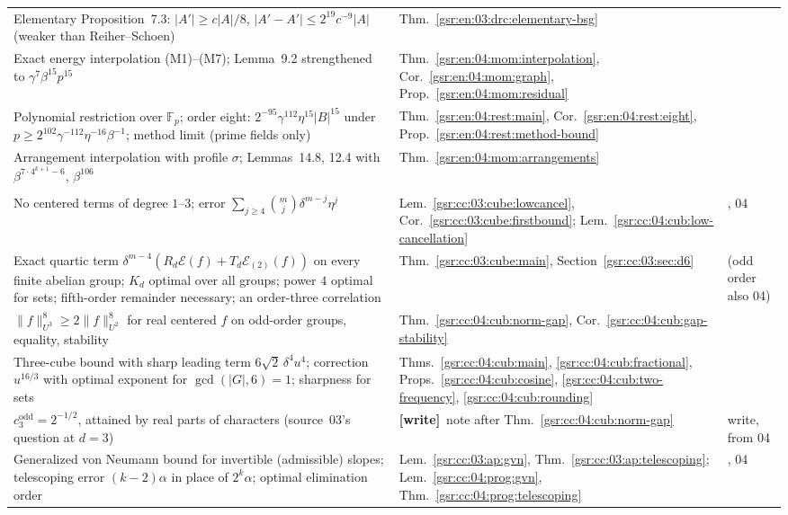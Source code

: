 \documentclass[11pt,letterpaper]{article}
\numberwithin{equation}{section}
\theoremstyle{definition}
\theoremstyle{remark}
\newcommand{\F}{\mathbb F}
\newcommand{\1}{\mathbf 1}
\newcommand{\wtag}{\textup{\textbf{[write]}}}
\begin{document}
\begin{longtable}{@{}>{\raggedright\arraybackslash}p{} >{\raggedright\arraybackslash}p{} >{\raggedright\arraybackslash}p{}@{}}
Elementary Proposition~7.3: $|A'|\ge c|A|/8$, $|A'-A'|\le2^{19}c^{-9}|A|$ (weaker than Reiher--Schoen) & Thm.~\ref{gsr:en:03:drc:elementary-bsg} & 03\\
Exact energy interpolation (M1)--(M7); Lemma~9.2 strengthened to $\gamma^7\beta^{15}p^{15}$ & Thm.~\ref{gsr:en:04:mom:interpolation}, Cor.~\ref{gsr:en:04:mom:graph}, Prop.~\ref{gsr:en:04:mom:residual} & 04\\
Polynomial restriction over $\F_p$; order eight: $2^{-95}\gamma^{112}\eta^{15}|B|^{15}$ under $p\ge2^{102}\gamma^{-112}\eta^{-16}\beta^{-1}$; method limit (prime fields only) & Thm.~\ref{gsr:en:04:rest:main}, Cor.~\ref{gsr:en:04:rest:eight}, Prop.~\ref{gsr:en:04:rest:method-bound} & 04\\
Arrangement interpolation with profile $\sigma$; Lemmas~14.8, 12.4 with $\beta^{7\cdot4^{k+1}-6}$, $\beta^{106}$ & Thm.~\ref{gsr:en:04:mom:arrangements} & 04\\
\midrule
\multicolumn{3}{@{}l}{\emph{Part III. Cube and progression counts}}\\
No centered terms of degree $1$--$3$; error $\sum_{j\ge4}\binom mj\delta^{m-j}\eta^j$ & Lem.~\ref{gsr:cc:03:cube:lowcancel}, Cor.~\ref{gsr:cc:03:cube:firstbound}; Lem.~\ref{gsr:cc:04:cub:low-cancellation} & 03, 04\\
Exact quartic term $\delta^{m-4}(R_d\mathcal E(f)+T_d\mathcal E_{(2)}(f))$ on every finite abelian group; $K_d$ optimal over all groups; power $4$ optimal for sets; fifth-order remainder necessary; an order-three correlation & Thm.~\ref{gsr:cc:03:cube:main}, Section~\ref{gsr:cc:03:sec:d6} & 03 (odd order also 04)\\
$\|f\|_{U^3}^8\ge2\|f\|_{U^2}^8$ for real centered $f$ on odd-order groups, equality, stability & Thm.~\ref{gsr:cc:04:cub:norm-gap}, Cor.~\ref{gsr:cc:04:cub:gap-stability} & 04\\
Three-cube bound with sharp leading term $6\sqrt2\,\delta^4u^4$; correction $u^{16/3}$ with optimal exponent for $\gcd(|G|,6)=1$; sharpness for sets & Thms.~\ref{gsr:cc:04:cub:main}, \ref{gsr:cc:04:cub:fractional}, Props.~\ref{gsr:cc:04:cub:cosine}, \ref{gsr:cc:04:cub:two-frequency}, \ref{gsr:cc:04:cub:rounding} & 04\\
$c_3^{\mathrm{odd}}=2^{-1/2}$, attained by real parts of characters (source~03's question at $d=3$) & \wtag\ note after Thm.~\ref{gsr:cc:04:cub:norm-gap} & write, from 04\\
Generalized von Neumann bound for invertible (admissible) slopes; telescoping error $(k-2)\alpha$ in place of $2^k\alpha$; optimal elimination order & Lem.~\ref{gsr:cc:03:ap:gvn}, Thm.~\ref{gsr:cc:03:ap:telescoping}; Lem.~\ref{gsr:cc:04:prog:gvn}, Thm.~\ref{gsr:cc:04:prog:telescoping} & 03, 04\\

\end{longtable}
\end{document}

